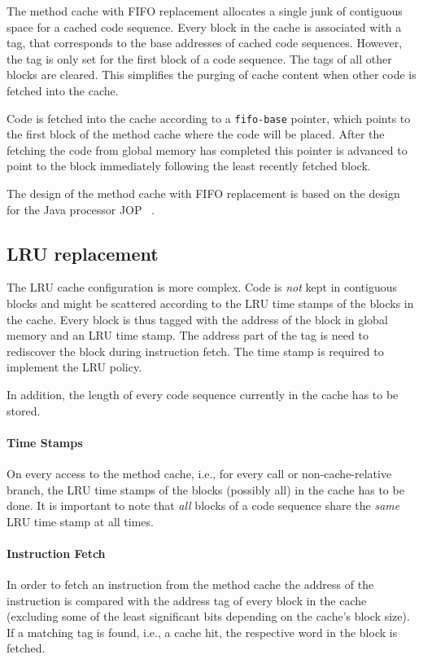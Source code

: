 \documentclass[a4paper,fontsize=10pt,twoside,DIV15,BCOR12mm,headinclude=true,footinclude=false,pagesize,bibtotoc]{scrbook}
\newcommand{\comment}[3]{

\textsf{\textbf{#1}} {\color{#3}#2}}
\newcommand{\fb}[1]{\comment{Florian}{#1}{Emerald}}
\renewcommand{\fb}[1]{}
\begin{document}
The method cache with FIFO replacement allocates a single junk of contiguous
space for a cached code sequence. Every block in the cache is associated with a
tag, that corresponds to the base addresses of cached code sequences. However,
the tag is only set for the first block of a code sequence. The tags of all
other blocks are cleared. This simplifies the purging of cache content when
other code is fetched into the cache.

Code is fetched into the cache according to a \texttt{fifo-base} pointer, which
points to the first block of the method cache where the code will be placed.
After the fetching the code from global memory has completed this pointer is
advanced to point to the block immediately following the least recently fetched
block.

The design of the method cache with FIFO replacement is based on the
design for the Java processor JOP~\cite{jop:jtres_cache} .

\subsection{LRU replacement}

The LRU cache configuration is more complex. Code is \emph{not} kept in
contiguous blocks and might be scattered according to the LRU time stamps of the
blocks in the cache. Every block is thus tagged with the address of the block
in global memory and an LRU time stamp. The address part of the tag is need to
rediscover the block during instruction fetch. The time stamp is required to
implement the LRU policy.

In addition, the length of every code sequence currently in the cache has to be
stored.

\paragraph*{Time Stamps}
On every access to the method cache, i.e., for every call or non-cache-relative
branch, the LRU time stamps of the blocks (possibly all) in the cache has to be
done. It is important to note that \emph{all} blocks of a code sequence share
the \emph{same} LRU time stamp at all times.

\fb{The time stamps could also be stored per code sequence in the cache. This
    might simplify the implementation of the LRU policy.}

\paragraph*{Instruction Fetch}
In order to fetch an instruction from the method cache the address of the
instruction is compared with the address tag of every block in the cache
(excluding some of the least significant bits depending on the cache's block
size). If a matching tag is found, i.e., a cache hit, the respective word in the
block is fetched.
\end{document}
